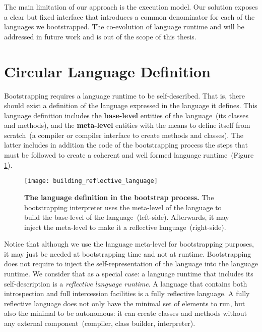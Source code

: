 The main limitation of our approach is the \VM execution model. Our solution exposes a clear but fixed \VM interface that introduces a common denominator for each of the languages we bootstrapped. The co-evolution of language runtime and \VM will be addressed in future work and is out of the scope of this thesis.

\section{Circular Language Definition}\label{sec:circular_definition}

Bootstrapping requires a language runtime to be self-described. That is, there should exist a definition of the language expressed in the language it defines. This language definition includes the \textbf{base-level} entities of the language~(its classes and methods), and the \textbf{meta-level} entities with the means to define itself from scratch~(\eg a compiler or compiler interface to create methods and classes). The latter includes in addition the code of the bootstrapping process \ie the steps that must be followed to create a coherent and well formed language runtime~(Figure \ref{fig:language_definition}).

\begin{figure}[ht]
\center
\texttt{[image: building\_reflective\_language]}
\caption{\textbf{The language definition in the bootstrap process.} The bootstrapping interpreter uses the meta-level of the language to build the base-level of the language~(left-side). Afterwards, it may inject the meta-level to make it a reflective language~(right-side).\label{fig:language_definition}}
\end{figure}

Notice that although we use the language meta-level for bootstrapping purposes, it may just be needed at bootstrapping time and not at runtime. Bootstrapping does not require to inject the self-representation of the language into the language runtime. We consider that as a special case: a language runtime that includes its self-description is a \emph{reflective language runtime}.
A language that contains both introspection and full intercession facilities is a fully reflective language. A fully reflective language does not only have the minimal set of elements to run, but also the minimal to be autonomous: it can create classes and methods without any external component~(compiler, class builder, interpreter).


